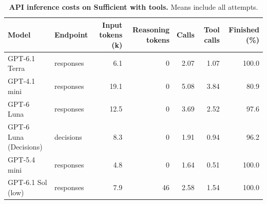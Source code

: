 \begin{table}[t]
\centering\small
\caption{\textbf{API inference costs on Sufficient with tools.} Means include all attempts.}
\begin{tabular}{@{}llrrrrr@{}}
\toprule
Model & Endpoint & Input tokens (k) & Reasoning tokens & Calls & Tool calls & Finished (\%)\\
\midrule
GPT-6.1 Terra & responses & 6.1 & 0 & 2.07 & 1.07 & 100.0\\
GPT-4.1 mini & responses & 19.1 & 0 & 5.08 & 3.84 & 80.9\\
GPT-6 Luna & responses & 12.5 & 0 & 3.69 & 2.52 & 97.6\\
GPT-6 Luna (Decisions) & decisions & 8.3 & 0 & 1.91 & 0.94 & 96.2\\
GPT-5.4 mini & responses & 4.8 & 0 & 1.64 & 0.51 & 100.0\\
GPT-6.1 Sol (low) & responses & 7.9 & 46 & 2.58 & 1.54 & 100.0\\
\bottomrule
\end{tabular}
\end{table}
